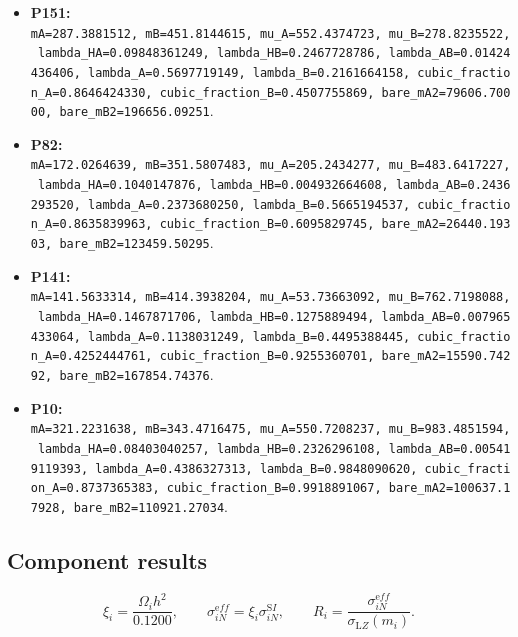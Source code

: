 \documentclass[
]{article}
\providecommand{\tightlist}{%
  \setlength{\itemsep}{0pt}\setlength{\parskip}{0pt}}
\begin{document}
\begin{itemize}
\tightlist
\item
  \textbf{P151:}
  \texttt{mA=287.3881512,\ mB=451.8144615,\ mu\_A=552.4374723,\ mu\_B=278.8235522,\ lambda\_HA=0.09848361249,\ lambda\_HB=0.2467728786,\ lambda\_AB=0.01424436406,\ lambda\_A=0.5697719149,\ lambda\_B=0.2161664158,\ cubic\_fraction\_A=0.8646424330,\ cubic\_fraction\_B=0.4507755869,\ bare\_mA2=79606.70000,\ bare\_mB2=196656.09251}.
\item
  \textbf{P82:}
  \texttt{mA=172.0264639,\ mB=351.5807483,\ mu\_A=205.2434277,\ mu\_B=483.6417227,\ lambda\_HA=0.1040147876,\ lambda\_HB=0.004932664608,\ lambda\_AB=0.2436293520,\ lambda\_A=0.2373680250,\ lambda\_B=0.5665194537,\ cubic\_fraction\_A=0.8635839963,\ cubic\_fraction\_B=0.6095829745,\ bare\_mA2=26440.19303,\ bare\_mB2=123459.50295}.
\item
  \textbf{P141:}
  \texttt{mA=141.5633314,\ mB=414.3938204,\ mu\_A=53.73663092,\ mu\_B=762.7198088,\ lambda\_HA=0.1467871706,\ lambda\_HB=0.1275889494,\ lambda\_AB=0.007965433064,\ lambda\_A=0.1138031249,\ lambda\_B=0.4495388445,\ cubic\_fraction\_A=0.4252444761,\ cubic\_fraction\_B=0.9255360701,\ bare\_mA2=15590.74292,\ bare\_mB2=167854.74376}.
\item
  \textbf{P10:}
  \texttt{mA=321.2231638,\ mB=343.4716475,\ mu\_A=550.7208237,\ mu\_B=983.4851594,\ lambda\_HA=0.08403040257,\ lambda\_HB=0.2326296108,\ lambda\_AB=0.005419119393,\ lambda\_A=0.4386327313,\ lambda\_B=0.9848090620,\ cubic\_fraction\_A=0.8737365383,\ cubic\_fraction\_B=0.9918891067,\ bare\_mA2=100637.17928,\ bare\_mB2=110921.27034}.
\end{itemize}

\hypertarget{component-results}{%
\subsection{Component results}\label{component-results}}

\[
\xi_i=\frac{\Omega_i h^2}{0.1200},\qquad
\sigma^{\mathrm eff}_{iN}=\xi_i\sigma^{\mathrm SI}_{iN},\qquad
R_i=\frac{\sigma^{\mathrm eff}_{iN}}{\sigma_{\mathrm LZ}(m_i)}.
\]
\end{document}
